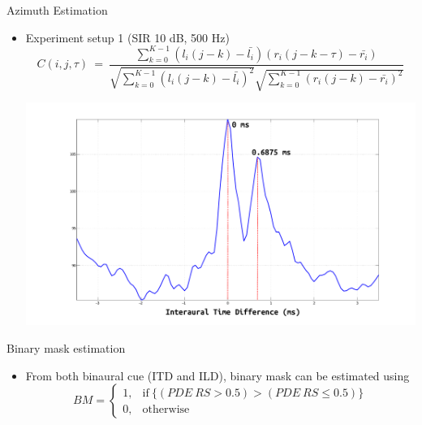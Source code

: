 \documentclass{beamer}
\begin{document}
\begin{frame}[t]{Azimuth Estimation}
\begin{itemize}
\item Experiment setup 1 (SIR 10 dB, 500 Hz)
\begin{equation}
{\scriptstyle C(i, j, \tau) ~=~ \frac{\sum_{k=0}^{K-1}(l_i(j-k)-\bar{l_i})(r_i(j-k-\tau)-\bar{r_i})}{\sqrt{\sum_{k=0}^{K-1}(l_i(j-k)-\bar{l_i})^2}\sqrt{\sum_{k=0}^{K-1}(r_i(j-k)-\bar{r_i})^2}}}
\end{equation}
\begin{center}
    \includegraphics[scale=0.2]{../pict/azimuth.pdf}
\end{center}
\end{itemize}
\end{frame}

\begin{frame}[t]{Binary mask estimation}
\begin{itemize}
\item From both binaural cue (ITD and ILD), binary mask can be estimated using
\begin{equation}
BM =
    \begin{cases}
      1, & \text{if}\ \{(PDE~RS > 0.5) > (PDE~RS \leq 0.5)\}\\
      0, & \text{otherwise}
    \end{cases}
\end{equation}
\end{itemize}
\end{frame}
\end{document}
